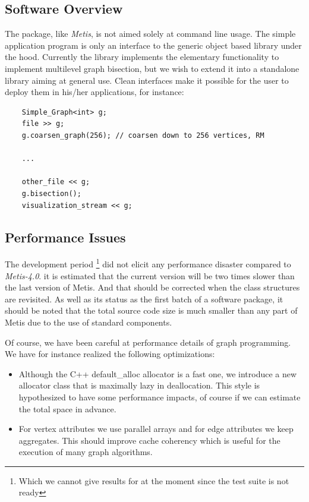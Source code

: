\documentclass[a4paper,12pt]{article}
\begin{document}
\subsection{Software Overview}
The package, like \textsl{Metis}, is not aimed solely at command line
usage. The simple application program is only an interface to the
generic object based library under the hood.
Currently the library implements the elementary functionality to
implement multilevel graph bisection, but we wish to extend it into a
standalone library aiming at general use.
Clean interfaces make it possible for the user to deploy them in
his/her applications, for instance:
\begin{verbatim}
	Simple_Graph<int> g;
	file >> g;
	g.coarsen_graph(256); // coarsen down to 256 vertices, RM
		
	...

	other_file << g;
	g.bisection();
	visualization_stream << g;
\end{verbatim}



\subsection{Performance Issues}

The development period \footnote{Which we cannot give results for at
the moment since the test suite is not ready} did not elicit any
performance disaster compared to \textsl{Metis-4.0}. it is estimated
that the current version will be two times slower than the last
version of Metis. And that should be corrected when the class
structures are revisited. As well as its status as the first batch of
a software package, it should be noted that the total source code size
is much smaller than any part of Metis due to the use of standard
components.


Of course, we have been careful at performance details of graph
programming. We have for instance realized the following
optimizations:
\begin{itemize}
\item Although the C++ default\_alloc allocator is a fast one, we
introduce a new allocator class that is maximally lazy in
deallocation. This style is hypothesized to have some performance
impacts, of course if we can estimate the total space in
advance.
\item For vertex attributes we use parallel arrays and for edge
attributes we keep aggregates. This should improve cache coherency
which is useful for the execution of many graph algorithms.
\end{itemize}
\end{document}
